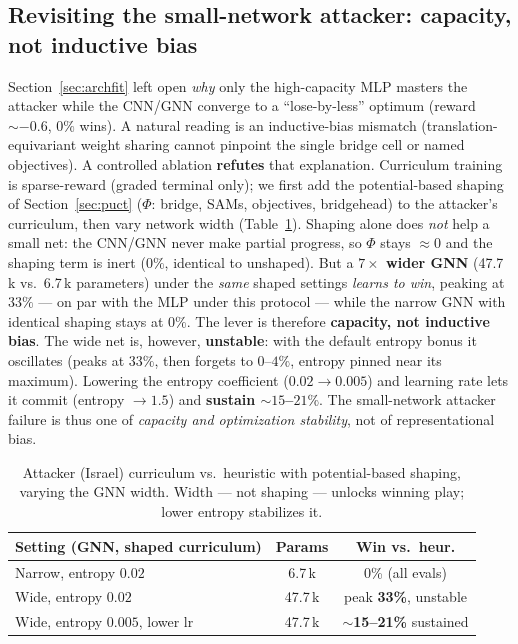 \documentclass{article}
\begin{document}
\subsection{Revisiting the small-network attacker: capacity, not inductive bias}
\label{sec:capacity}
Section~\ref{sec:archfit} left open \emph{why} only the high-capacity MLP masters the
attacker while the CNN/GNN converge to a ``lose-by-less'' optimum (reward $\sim-0.6$,
$0\%$ wins). A natural reading is an inductive-bias mismatch (translation-equivariant
weight sharing cannot pinpoint the single bridge cell or named objectives). A controlled
ablation \textbf{refutes} that explanation. Curriculum training is sparse-reward
(graded terminal only); we first add the potential-based shaping of
Section~\ref{sec:puct} ($\Phi$: bridge, SAMs, objectives, bridgehead) to the attacker's
curriculum, then vary network width (Table~\ref{tab:cap}). Shaping alone does \emph{not}
help a small net: the CNN/GNN never make partial progress, so $\Phi$ stays $\approx 0$ and
the shaping term is inert ($0\%$, identical to unshaped). But a \textbf{$7\times$ wider
GNN} (47.7\,k vs.\ 6.7\,k parameters) under the \emph{same} shaped settings \emph{learns
to win}, peaking at $33\%$ --- on par with the MLP under this protocol --- while the
narrow GNN with identical shaping stays at $0\%$. The lever is therefore \textbf{capacity,
not inductive bias}. The wide net is, however, \textbf{unstable}: with the default entropy
bonus it oscillates (peaks at $33\%$, then forgets to $0$--$4\%$, entropy pinned near its
maximum). Lowering the entropy coefficient ($0.02\!\to\!0.005$) and learning rate lets it
commit (entropy $\to 1.5$) and \textbf{sustain $\sim$$15$--$21\%$}. The small-network
attacker failure is thus one of \emph{capacity and optimization stability}, not of
representational bias.

\begin{table}[t]
\centering
\caption{Attacker (Israel) curriculum vs.\ heuristic with potential-based shaping, varying
the GNN width. Width --- not shaping --- unlocks winning play; lower entropy stabilizes it.}
\label{tab:cap}
\begin{tabular}{lcc}
\toprule
\textbf{Setting (GNN, shaped curriculum)} & \textbf{Params} & \textbf{Win vs.\ heur.} \\
\midrule
Narrow, entropy $0.02$           & 6.7\,k  & 0\% (all evals) \\
Wide, entropy $0.02$             & 47.7\,k & peak \textbf{33\%}, unstable \\
Wide, entropy $0.005$, lower lr  & 47.7\,k & \textbf{$\sim$15--21\%} sustained \\
\bottomrule
\end{tabular}
\end{table}
\end{document}
